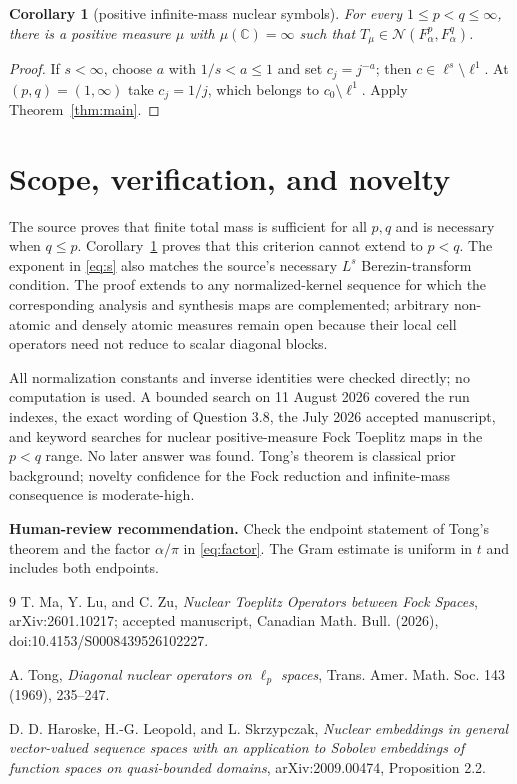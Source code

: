 \documentclass[10pt]{article}
\newtheorem{corollary}[theorem]{Corollary}
\newcommand{\Nuc}{\mathcal N}
\newcommand{\C}{\mathbb C}
\begin{document}
\begin{corollary}[positive infinite-mass nuclear symbols]\label{cor:mass}
For every $1\le p<q\le\infty$, there is a positive measure $\mu$ with
$\mu(\C)=\infty$ such that
$T_\mu\in\Nuc(F_\alpha^p,F_\alpha^q)$.
\end{corollary}

\begin{proof}
If $s<\infty$, choose $a$ with $1/s<a\le1$ and set $c_j=j^{-a}$; then
$c\in\ell^s\setminus\ell^1$.  At $(p,q)=(1,\infty)$ take $c_j=1/j$, which
belongs to $c_0\setminus\ell^1$.  Apply Theorem~\ref{thm:main}.
\end{proof}

\section*{Scope, verification, and novelty}

The source proves that finite total mass is sufficient for all $p,q$ and is
necessary when $q\le p$.  Corollary~\ref{cor:mass} proves that this criterion
cannot extend to $p<q$.  The exponent in \eqref{eq:s} also matches the source's
necessary $L^s$ Berezin-transform condition.  The proof extends to any
normalized-kernel sequence for which the corresponding analysis and synthesis
maps are complemented; arbitrary non-atomic and densely atomic measures remain
open because their local cell operators need not reduce to scalar diagonal
blocks.

All normalization constants and inverse identities were checked directly; no
computation is used.  A bounded search on 11 August 2026 covered the run indexes,
the exact wording of Question 3.8, the July 2026 accepted manuscript, and
keyword searches for nuclear positive-measure Fock Toeplitz maps in the $p<q$
range.  No later answer was found.  Tong's theorem is classical prior
background; novelty confidence for the Fock reduction and infinite-mass
consequence is moderate-high.

\textbf{Human-review recommendation.} Check the endpoint statement of Tong's
theorem and the factor $\alpha/\pi$ in \eqref{eq:factor}.  The Gram estimate is
uniform in $t$ and includes both endpoints.

\begin{thebibliography}{9}
T. Ma, Y. Lu, and C. Zu,
\emph{Nuclear Toeplitz Operators between Fock Spaces},
arXiv:2601.10217; accepted manuscript, Canadian Math. Bull. (2026),
doi:10.4153/S0008439526102227.

A. Tong,
\emph{Diagonal nuclear operators on $\ell_p$ spaces},
Trans. Amer. Math. Soc. 143 (1969), 235--247.

D. D. Haroske, H.-G. Leopold, and L. Skrzypczak,
\emph{Nuclear embeddings in general vector-valued sequence spaces with an
application to Sobolev embeddings of function spaces on quasi-bounded domains},
arXiv:2009.00474, Proposition 2.2.
\end{thebibliography}
\end{document}
